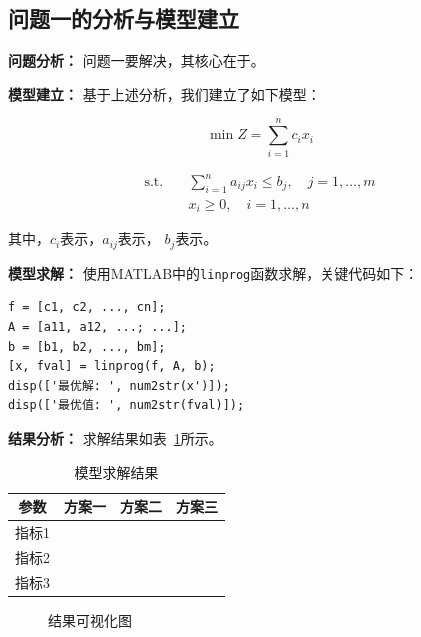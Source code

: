 \documentclass[12pt,a4paper]{article}
\begin{document}

\subsection{问题一的分析与模型建立}

\textbf{问题分析：}
问题一要解决\underline{\hspace{4cm}}，其核心在于\underline{\hspace{4cm}}。

\textbf{模型建立：}
基于上述分析，我们建立了如下模型：

\begin{equation}
  \label{eq:model1}
  \min Z = \sum_{i=1}^{n} c_i x_i
\end{equation}

\begin{align}
  \text{s.t.} \quad & \sum_{i=1}^{n} a_{ij} x_i \leq b_j,\quad j=1,\dots,m \\
  & x_i \geq 0,\quad i=1,\dots,n
\end{align}

其中，$c_i$表示\underline{\hspace{2cm}}，$a_{ij}$表示\underline{\hspace{2cm}}，
$b_j$表示\underline{\hspace{2cm}}。

\textbf{模型求解：}
使用MATLAB中的\texttt{linprog}函数求解，关键代码如下：

\begin{lstlisting}[caption=核心求解代码]
f = [c1, c2, ..., cn];
A = [a11, a12, ...; ...];
b = [b1, b2, ..., bm];
[x, fval] = linprog(f, A, b);
disp(['最优解: ', num2str(x')]);
disp(['最优值: ', num2str(fval)]);
\end{lstlisting}

\textbf{结果分析：}
求解结果如表~\ref{tab:result1}所示。

\begin{table}[H]
\centering
\caption{模型求解结果}
\label{tab:result1}
\begin{tabular}{cccc}
  \toprule
  参数 & 方案一 & 方案二 & 方案三 \\
  \midrule
  指标1 &  &  &  \\
  指标2 &  &  &  \\
  指标3 &  &  &  \\
  \bottomrule
\end{tabular}
\end{table}

\begin{figure}[H]
\centering
\caption{结果可视化图}
\label{fig:result1}
\end{figure}
\end{document}
